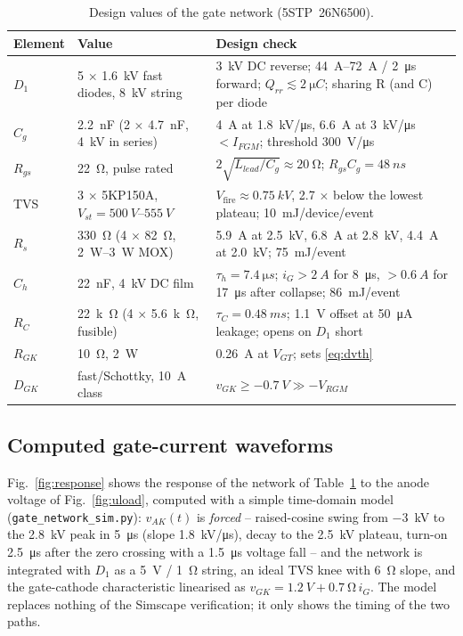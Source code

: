 \documentclass[11pt,a4paper]{article}
\begin{document}
\begin{table}[htbp]
\centering
\caption{Design values of the gate network (5STP~26N6500).}
\label{tab:gate}
\begin{tabular}{@{}llp{7.6cm}@{}}
\toprule
Element & Value & Design check \\
\midrule
$D_1$ & 5 $\times$ \SI{1.6}{kV} fast diodes, \SI{8}{kV} string & \SI{3}{kV} DC reverse; \SIrange{44}{72}{A} / \SI{2}{\micro s} forward; $Q_{rr} \lesssim \SI{2}{\micro C}$; sharing R (and C) per diode \\
$C_g$ & \SI{2.2}{nF} (2 $\times$ \SI{4.7}{nF}, \SI{4}{kV} in series) & \SI{4}{A} at \SI{1.8}{kV/\micro s}, \SI{6.6}{A} at \SI{3}{kV/\micro s} $< I_{FGM}$; threshold \SI{300}{V/\micro s} \\
$R_{gs}$ & \SI{22}{\ohm}, pulse rated & $2\sqrt{L_{lead}/C_g} \approx \SI{20}{\ohm}$; $R_{gs}C_g = \SI{48}{ns}$ \\
TVS & 3 $\times$ 5KP150A, $V_{st} = \SIrange{500}{555}{V}$ & $V_{\mathrm{fire}} \approx \SI{0.75}{kV}$, \SI{2.7}{} $\times$ below the lowest plateau; \SI{10}{mJ}/device/event \\
$R_s$ & \SI{330}{\ohm} (4 $\times$ \SI{82}{\ohm}, \SIrange{2}{3}{W} MOX) & \SI{5.9}{A} at \SI{2.5}{kV}, \SI{6.8}{A} at \SI{2.8}{kV}, \SI{4.4}{A} at \SI{2.0}{kV}; \SI{75}{mJ}/event \\
$C_h$ & \SI{22}{nF}, \SI{4}{kV} DC film & $\tau_h = \SI{7.4}{\micro s}$; $i_G > \SI{2}{A}$ for \SI{8}{\micro s}, $> \SI{0.6}{A}$ for \SI{17}{\micro s} after collapse; \SI{86}{mJ}/event \\
$R_C$ & \SI{22}{k\ohm} (4 $\times$ \SI{5.6}{k\ohm}, fusible) & $\tau_C = \SI{0.48}{ms}$; \SI{1.1}{V} offset at \SI{50}{\micro A} leakage; opens on $D_1$ short \\
$R_{GK}$ & \SI{10}{\ohm}, \SI{2}{W} & \SI{0.26}{A} at $V_{GT}$; sets \eqref{eq:dvth} \\
$D_{GK}$ & fast/Schottky, \SI{10}{A} class & $v_{GK} \ge \SI{-0.7}{V} \gg -V_{RGM}$ \\
\bottomrule
\end{tabular}
\end{table}

\subsection{Computed gate-current waveforms}
\label{sec:model}

Fig.~\ref{fig:response} shows the response of the network of Table~\ref{tab:gate} to the
anode voltage of Fig.~\ref{fig:uload}, computed with a simple time-domain model
(\texttt{gate\_network\_sim.py}): $v_{AK}(t)$ is \emph{forced} -- raised-cosine swing from
\SI{-3}{kV} to the \SI{2.8}{kV} peak in \SI{5}{\micro s} (slope \SI{1.8}{kV/\micro s}), decay
to the \SI{2.5}{kV} plateau, turn-on \SI{2.5}{\micro s} after the zero crossing with a
\SI{1.5}{\micro s} voltage fall -- and the network is integrated with $D_1$ as a \SI{5}{V} /
\SI{1}{\ohm} string, an ideal TVS knee with \SI{6}{\ohm} slope, and the gate-cathode
characteristic linearised as $v_{GK} = \SI{1.2}{V} + \SI{0.7}{\ohm}\,i_G$. The model replaces
nothing of the Simscape verification; it only shows the timing of the two paths.
\end{document}
